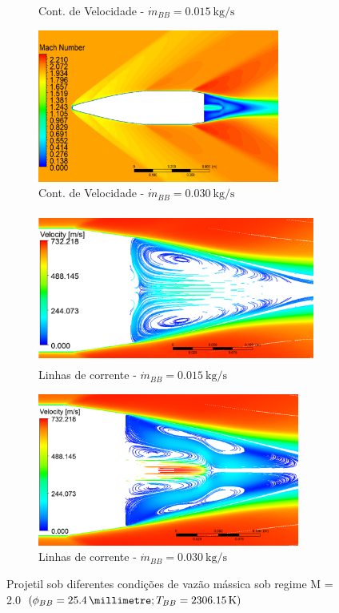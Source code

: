 \begin{figure}[!ht]
\begin{subfigure}[b]{0.47\textwidth}
        \caption{Cont. de Velocidade - $\Dot{m}_{BB} = \qty{0,015}{\kilogram\per\second}$}
        \label{fig:contorno-velocidade-bb-1pol-vazao0015}
    \end{subfigure}
    \hfill
	\begin{subfigure}[b]{0.47\textwidth}
        \centering
        \includegraphics[height=5cm,width=\textwidth]{contorno-velocidade-2306K-vazao-0030-1pol.png}
        \caption{Cont. de Velocidade - $\Dot{m}_{BB} = \qty{0,030}{\kilogram\per\second}$}
        \label{fig:contorno-velocidade-bb-1pol-vazao0030}
    \end{subfigure}
    \hfill
    \begin{subfigure}[b]{0.47\textwidth}
        \centering
        \includegraphics[height=5cm,width=\textwidth]{corrente-velocidade-2306K-vazao-0015-1pol.png}
        \caption{Linhas de corrente - $\Dot{m}_{BB} = \qty{0,015}{\kilogram\per\second}$}
        \label{fig:corrente-velocidade-bb-1pol-vazao0015}
    \end{subfigure}
    \hfill
    \begin{subfigure}[b]{0.47\textwidth}
        \centering
        \includegraphics[height=5cm,width=\textwidth]{corrente-velocidade-2306K-vazao-0030-1pol.png}
        \caption{Linhas de corrente - $\Dot{m}_{BB} = \qty{0,030}{\kilogram\per\second}$}
        \label{fig:corrente-velocidade-bb-1pol-vazao0030}
    \end{subfigure}
	\caption{Projetil sob diferentes condições de vazão mássica sob regime M = \num{2,0} $\left(\phi_{BB} = \qty{25,4}{\millimetre}; T_{BB} = \qty{2306,15}{\kelvin}\right)$}
	\label{fig:influencia-diametro-vazao-1pol}
\end{figure}

